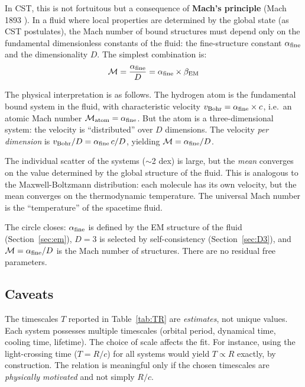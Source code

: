 \documentclass[10pt,a4paper]{article}
\begin{document}
In CST, this is not fortuitous but a consequence of \textbf{Mach's principle} (Mach 1893 \cite{Mach1893}). In a fluid where local properties are determined by the global state (as CST postulates), the Mach number of bound structures must depend only on the fundamental dimensionless constants of the fluid: the fine-structure constant $\alpha_{\rm fine}$ and the dimensionality $D$. The simplest combination is:
\begin{equation}\label{eq:mach_alpha}
\mathcal{M} = \frac{\alpha_{\rm fine}}{D} = \alpha_{\rm fine} \times \beta_{\rm EM}
\end{equation}

The physical interpretation is as follows. The hydrogen atom is the fundamental bound system in the fluid, with characteristic velocity $v_{\rm Bohr} = \alpha_{\rm fine} \times c$, i.e.\ an atomic Mach number $\mathcal{M}_{\rm atom} = \alpha_{\rm fine}$. But the atom is a three-dimensional system: the velocity is ``distributed'' over $D$ dimensions. The velocity \textit{per dimension} is $v_{\rm Bohr}/D = \alpha_{\rm fine}\,c/D$, yielding $\mathcal{M} = \alpha_{\rm fine}/D$.

The individual scatter of the systems ($\sim$2 dex) is large, but the \textit{mean} converges on the value determined by the global structure of the fluid. This is analogous to the Maxwell-Boltzmann distribution: each molecule has its own velocity, but the mean converges on the thermodynamic temperature. The universal Mach number is the ``temperature'' of the spacetime fluid.

The circle closes: $\alpha_{\rm fine}$ is defined by the EM structure of the fluid (Section~\ref{sec:em}), $D = 3$ is selected by self-consistency (Section~\ref{sec:D3}), and $\mathcal{M} = \alpha_{\rm fine}/D$ is the Mach number of structures. There are no residual free parameters.

\subsection{Caveats}

The timescales $T$ reported in Table~\ref{tab:TR} are \textit{estimates}, not unique values. Each system possesses multiple timescales (orbital period, dynamical time, cooling time, lifetime). The choice of scale affects the fit. For instance, using the light-crossing time ($T = R/c$) for all systems would yield $T \propto R$ exactly, by construction. The relation is meaningful only if the chosen timescales are \textit{physically motivated} and not simply $R/c$.
\end{document}
